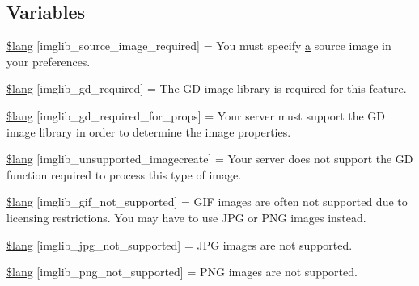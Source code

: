\subsection*{Variables}
\begin{DoxyCompactItemize}
\item 
\hyperlink{imglib__lang_8php_af48787ab142f633036ebdf1cc5da7409}{\$lang} \mbox{[}\textquotesingle{}imglib\+\_\+source\+\_\+image\+\_\+required\textquotesingle{}\mbox{]} = \textquotesingle{}You must specify \hyperlink{assets_2js_2bootstrap_8min_8js_a1f5870dcf487187f13d5fd328ed9e6e7}{a} source image in your preferences.\textquotesingle{}
\item 
\hyperlink{imglib__lang_8php_aa8d7f8276e62fbe759daef2021c16552}{\$lang} \mbox{[}\textquotesingle{}imglib\+\_\+gd\+\_\+required\textquotesingle{}\mbox{]} = \textquotesingle{}The G\+D image library is required for this feature.\textquotesingle{}
\item 
\hyperlink{imglib__lang_8php_a0da9c99f9e2b5f38ccbefb9d9f702c5e}{\$lang} \mbox{[}\textquotesingle{}imglib\+\_\+gd\+\_\+required\+\_\+for\+\_\+props\textquotesingle{}\mbox{]} = \textquotesingle{}Your server must support the G\+D image library in order to determine the image properties.\textquotesingle{}
\item 
\hyperlink{imglib__lang_8php_ace032cbe8dafb1f3417a758d0914ecdb}{\$lang} \mbox{[}\textquotesingle{}imglib\+\_\+unsupported\+\_\+imagecreate\textquotesingle{}\mbox{]} = \textquotesingle{}Your server does not support the G\+D function required to process this type of image.\textquotesingle{}
\item 
\hyperlink{imglib__lang_8php_a235a59a6660145fc136b3933b5b10675}{\$lang} \mbox{[}\textquotesingle{}imglib\+\_\+gif\+\_\+not\+\_\+supported\textquotesingle{}\mbox{]} = \textquotesingle{}G\+I\+F images are often not supported due to licensing restrictions. You may have to use J\+P\+G or P\+N\+G images instead.\textquotesingle{}
\item 
\hyperlink{imglib__lang_8php_a4acdc927c172bab1370b2897c667c552}{\$lang} \mbox{[}\textquotesingle{}imglib\+\_\+jpg\+\_\+not\+\_\+supported\textquotesingle{}\mbox{]} = \textquotesingle{}J\+P\+G images are not supported.\textquotesingle{}
\item 
\hyperlink{imglib__lang_8php_a0b7ea2e2fbd03eb72fe9d969adb643dd}{\$lang} \mbox{[}\textquotesingle{}imglib\+\_\+png\+\_\+not\+\_\+supported\textquotesingle{}\mbox{]} = \textquotesingle{}P\+N\+G images are not supported.\textquotesingle{}
\item 

\end{DoxyCompactItemize}
